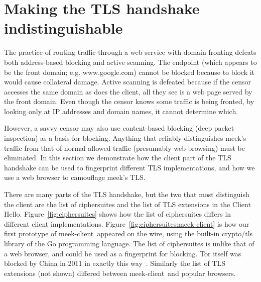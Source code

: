\documentclass[conference]{IEEEtran}
\def\meekclient{\mbox{meek-client}}
\begin{document}
\section{Making the TLS handshake indistinguishable}
\label{sec:browserextension}

The practice of routing traffic through a web service with domain fronting
defeats both address-based blocking and active scanning.
The endpoint (which appears to be the front domain; e.g. www.google.com)
cannot be blocked because to block it would cause collateral damage.
Active scanning is defeated because if the censor accesses the same
domain as does the client, all they see is a web page served by the front domain.
Even though the censor knows some traffic is being fronted,
by looking only at IP addresses and domain names, it cannot determine which.

However, a savvy censor may also use content-based blocking
(deep packet inspection) as a basis for blocking.
Anything that reliably distinguishes meek's traffic from that of normal allowed traffic
(presumably web browsing) must be eliminated.
In this section we demonstrate how the client part of the TLS handshake can be used
to fingerprint different TLS implementations,
and how we use a web browser to camouflage meek's TLS.

There are many parts of the TLS handshake, but the two that
most distinguish the client are the list of ciphersuites and the
list of TLS extensions in the Client Hello.
Figure~\ref{fig:ciphersuites} shows how the list of ciphersuites
differs in different client implementations.
Figure~\ref{fig:ciphersuites:meek-client} is how our first prototype of \meekclient\ appeared on the wire,
using the built-in crypto/tls library of the Go programming language.
The list of ciphersuites is unlike that of a web browser,
and could be used as a fingerprint for blocking.
Tor itself was blocked by China in 2011 in exactly this way~\cite{bug4744}.
Similarly the list of TLS extensions (not shown)
differed between \meekclient\ and popular browsers.
\end{document}
